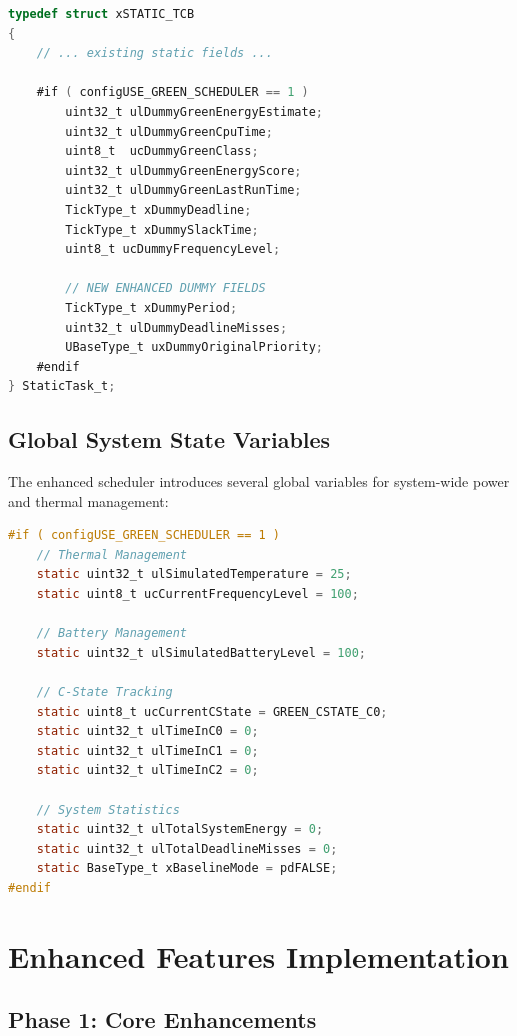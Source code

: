 \documentclass[11pt,a4paper]{article}
\begin{document}
\begin{lstlisting}[language=C, caption=Enhanced StaticTask\_t Structure]
typedef struct xSTATIC_TCB
{
    // ... existing static fields ...
    
    #if ( configUSE_GREEN_SCHEDULER == 1 )
        uint32_t ulDummyGreenEnergyEstimate;
        uint32_t ulDummyGreenCpuTime;
        uint8_t  ucDummyGreenClass;
        uint32_t ulDummyGreenEnergyScore;
        uint32_t ulDummyGreenLastRunTime;
        TickType_t xDummyDeadline;
        TickType_t xDummySlackTime;
        uint8_t ucDummyFrequencyLevel;
        
        // NEW ENHANCED DUMMY FIELDS
        TickType_t xDummyPeriod;
        uint32_t ulDummyDeadlineMisses;
        UBaseType_t uxDummyOriginalPriority;
    #endif
} StaticTask_t;
\end{lstlisting}

\subsection{Global System State Variables}
The enhanced scheduler introduces several global variables for system-wide power and thermal management:

\begin{lstlisting}[language=C, caption=Enhanced System State Variables]
#if ( configUSE_GREEN_SCHEDULER == 1 )
    // Thermal Management
    static uint32_t ulSimulatedTemperature = 25;
    static uint8_t ucCurrentFrequencyLevel = 100;
    
    // Battery Management
    static uint32_t ulSimulatedBatteryLevel = 100;
    
    // C-State Tracking
    static uint8_t ucCurrentCState = GREEN_CSTATE_C0;
    static uint32_t ulTimeInC0 = 0;
    static uint32_t ulTimeInC1 = 0;
    static uint32_t ulTimeInC2 = 0;
    
    // System Statistics
    static uint32_t ulTotalSystemEnergy = 0;
    static uint32_t ulTotalDeadlineMisses = 0;
    static BaseType_t xBaselineMode = pdFALSE;
#endif
\end{lstlisting}

\section{Enhanced Features Implementation}

\subsection{Phase 1: Core Enhancements}
\end{document}
